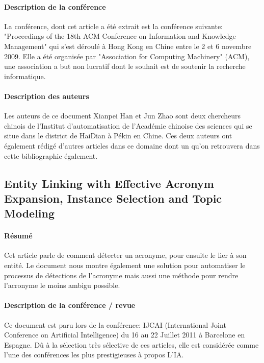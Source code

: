 \documentclass{article}
\begin{document}
\paragraph{Description de la conférence}
La conférence, dont cet article a été extrait est la conférence suivante: "Proceedings of the 18th ACM Conference on Information and Knowledge Management" qui s'est déroulé à Hong Kong en Chine entre le 2 et 6 novembre 2009. Elle a été organisée par "Association for Computing Machinery" (ACM), une association a but non lucratif dont le souhait est de soutenir la recherche informatique.

\paragraph{Description des auteurs}
Les auteurs de ce document Xianpei Han et Jun Zhao sont deux chercheurs chinois de l'Institut d'automatisation de l'Académie chinoise des sciences qui se situe dans le district de HaiDian à Pékin en Chine. Ces deux auteurs ont également rédigé d'autres articles dans ce domaine dont un qu'on retrouvera dans cette bibliographie également.

\subsection{Entity Linking with Effective Acronym Expansion, Instance Selection and Topic Modeling\cite{article-9}}

\paragraph{Résumé}

Cet article parle de comment détecter un acronyme, pour ensuite le lier à son entité. Le document nous montre également une solution pour automatiser le processus de détections de l’acronyme mais aussi une méthode pour rendre l’acronyme le moins ambigu possible.

\paragraph{Description de la conférence / revue}

Ce document est paru lors de la conférence: IJCAI (International Joint Conference on Artificial Intelligence) du 16 au 22 Juillet 2011 à Barcelone en Espagne. Dû à la sélection très sélective de ces articles, elle est considérée comme l'une des conférences les plus prestigieuses à propos L'IA.
\end{document}
